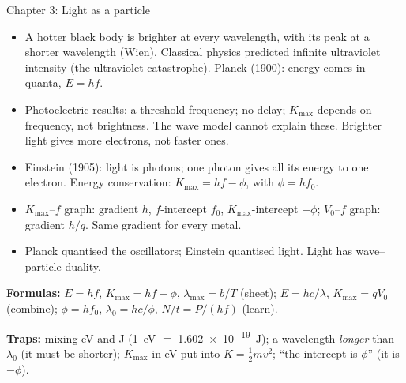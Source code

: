 \begin{summarybox}[fontupper=\small]{Chapter 3: Light as a particle}
\begin{itemize}[itemsep=0pt, topsep=2pt]
  \item A hotter black body is brighter at every wavelength, with its peak at a shorter
        wavelength (Wien). Classical physics predicted infinite ultraviolet intensity (the
        ultraviolet catastrophe). Planck (1900): energy comes in quanta, $E = hf$.
  \item Photoelectric results: a threshold frequency; no delay; $K_\mathrm{max}$ depends on
        frequency, not brightness. The wave model cannot explain these. Brighter light gives
        more electrons, not faster ones.
  \item Einstein (1905): light is photons; one photon gives all its energy to one electron.
        Energy conservation: $K_\mathrm{max} = hf - \phi$, with $\phi = hf_0$.
  \item $K_\mathrm{max}$--$f$ graph: gradient $h$, $f$-intercept $f_0$, $K_\mathrm{max}$-intercept
        $-\phi$; $V_0$--$f$ graph: gradient $h/q$. Same gradient for every metal.
  \item Planck quantised the oscillators; Einstein quantised light. Light has wave--particle
        duality.
\end{itemize}
\textbf{Formulas:} $E = hf$, $K_\mathrm{max} = hf - \phi$, $\lambda_\mathrm{max} = b/T$
(sheet); $E = hc/\lambda$, $K_\mathrm{max} = qV_0$ (combine); $\phi = hf_0$,
$\lambda_0 = hc/\phi$, $N/t = P/(hf)$ (learn).
\par\textbf{Traps:} \textcolor{hscmistake}{\faTimes} mixing \si{eV} and \si{J}
(\qty{1}{\eV} $=$ \qty{1.602e-19}{J}); \textcolor{hscmistake}{\faTimes} a wavelength
\emph{longer} than $\lambda_0$ (it must be shorter); \textcolor{hscmistake}{\faTimes}
$K_\mathrm{max}$ in \si{eV} put into $K = \frac{1}{2}mv^2$; \textcolor{hscmistake}{\faTimes}
``the intercept is $\phi$'' (it is $-\phi$).
\end{summarybox}

